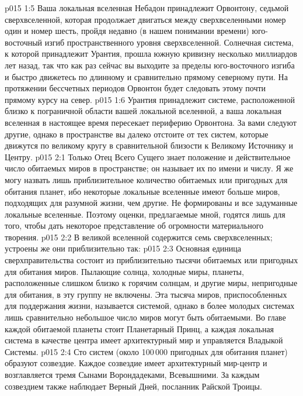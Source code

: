 \vs p015 1:5 Ваша локальная вселенная Небадон принадлежит Орвонтону, седьмой сверхвселенной, которая продолжает двигаться между сверхвселенными номер один и номер шесть, пройдя недавно (в нашем понимании времени) юго\hyp{}восточный изгиб пространственного уровня сверхвселенной. Солнечная система, к которой принадлежит Урантия, прошла южную кривизну несколько миллиардов лет назад, так что как раз сейчас вы выходите за пределы юго\hyp{}восточного изгиба и быстро движетесь по длинному и сравнительно прямому северному пути. На протяжении бессчетных периодов Орвонтон будет следовать этому почти прямому курсу на север.
\vs p015 1:6 Урантия принадлежит системе, расположенной близко к пограничной области вашей локальной вселенной, а ваша локальная вселенная в настоящее время пересекает периферию Орвонтона. За вами следуют другие, однако в пространстве вы далеко отстоите от тех систем, которые движутся по великому кругу в сравнительной близости к Великому Источнику и Центру.
\vs p015 2:1 Только Отец Всего Сущего знает положение и действительное число обитаемых миров в пространстве; он называет их по имени и числу. Я же могу назвать лишь приблизительное количество обитаемых или пригодных для обитания планет, ибо некоторые локальные вселенные имеют больше миров, подходящих для разумной жизни, чем другие. Не формированы и все задуманные локальные вселенные. Поэтому оценки, предлагаемые мной, годятся лишь для того, чтобы дать некоторое представление об огромности материального творения.
\vs p015 2:2 \pc В великой вселенной содержится семь сверхвселенных; устроены же они приблизительно так:
\vs p015 2:3 \pc {}\bibnobreakspace {} Основная единица сверхправительства состоит из приблизительно тысячи обитаемых или пригодных для обитания миров. Пылающие солнца, холодные миры, планеты, расположенные слишком близко к горячим солнцам, и другие миры, непригодные для обитания, в эту группу не включены. Эта тысяча миров, приспособленных для поддержания жизни, называется системой, однако в более молодых системах лишь сравнительно небольшое число миров могут быть обитаемыми. Во главе каждой обитаемой планеты стоит Планетарный Принц, а каждая локальная система в качестве центра имеет архитектурный мир и управляется Владыкой Системы.
\vs p015 2:4 \pc {}\bibnobreakspace {} Сто систем (около 100\,000 пригодных для обитания планет) образуют созвездие. Каждое созвездие имеет архитектурный мир\hyp{}центр и возглавляется тремя Сынами Ворондадеками, Всевышними. За каждым созвездием также наблюдает Верный Дней, посланник Райской Троицы.
